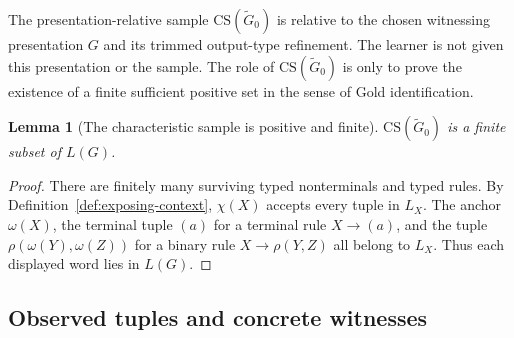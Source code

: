 \documentclass[11pt,a4paper]{article}
\newtheorem{lemma}[theorem]{Lemma}
\theoremstyle{remark}
\newcommand{\CS}{\mathrm{CS}}
\begin{document}
The presentation-relative sample \(\CS(\widetilde G_0)\) is relative to the chosen
witnessing presentation \(G\) and its trimmed output-type refinement.  The learner is not
given this presentation or the sample.  The role of \(\CS(\widetilde G_0)\) is
only to prove the existence of a finite sufficient positive set in the sense of
Gold identification.

\begin{lemma}[The characteristic sample is positive and finite]
\label{lem:cs-positive}
\(\CS(\widetilde G_0)\) is a finite subset of \(L(G)\).
\end{lemma}

\begin{proof}
There are finitely many surviving typed nonterminals and typed rules.  By
Definition~\ref{def:exposing-context}, \(\chi(X)\) accepts every tuple in
\(L_X\).  The anchor \(\omega(X)\), the terminal tuple \((a)\) for a terminal
rule \(X\to(a)\), and the tuple \(\rho(\omega(Y),\omega(Z))\) for a binary rule
\(X\to\rho(Y,Z)\) all belong to \(L_X\).  Thus each displayed word lies in
\(L(G)\).
\end{proof}



\subsection{Observed tuples and concrete witnesses}
\end{document}
